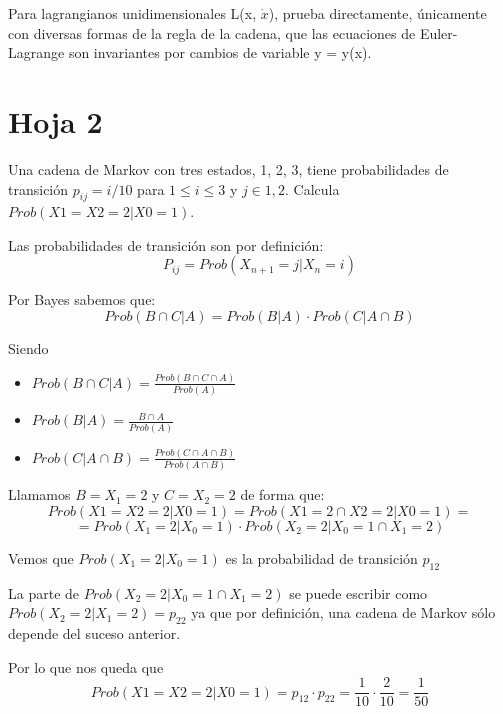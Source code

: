 \begin{problem}[15]
Para lagrangianos unidimensionales L(x, $\dot{x}$), prueba directamente, únicamente con diversas formas de la regla de la cadena, que las ecuaciones de Euler-Lagrange son invariantes por cambios de variable y = y(x).

\solution

\end{problem}

\section{Hoja 2}

\begin{problem}[1]
	Una cadena de Markov con tres estados, {1, 2, 3}, tiene probabilidades de transición
	$p_{ij} = i/10$ para $1 ≤ i ≤ 3$ y $j ∈ {1, 2}$. Calcula $Prob(X1 = X2 = 2|X0 = 1)$.

	\solution
	Las probabilidades de transición son por definición:
	$$P_{ij} = Prob(X_{n+1} = j | X_n = i)$$

	Por Bayes sabemos que:
	$$Prob(B\cap C|A) = Prob(B|A) \cdot Prob(C|A\cap B)$$

	Siendo
	\begin{itemize}
		\item 	$Prob(B\cap C|A) = \frac{Prob(B\cap C \cap A)}{Prob (A)}$
		\item  $ Prob(B|A) = \frac{B\cap A}{Prob(A)}$
		\item  $Prob(C|A\cap B)= \frac{Prob(C\cap A \cap B)}{Prob(A\cap B)}$
	\end{itemize}

	Llamamos $B={X_1 = 2}$ y $C={X_2 = 2}$ de forma que:
	\[Prob(X1 = X2 = 2|X0 = 1) = Prob(X1 = 2 \cap X2 = 2|X0 = 1) =\]
	\[= Prob (X_1=2|X_0=1) \cdot Prob(X_2 =2 |X_0 = 1 \cap X_1 =2)\]

	Vemos que $Prob (X_1=2|X_0=1)$ es la probabilidad de transición $p_{12}$

	La parte de $Prob(X_2 =2 |X_0 = 1 \cap X_1 =2)$ se puede escribir como $Prob(X_2 =2 | X_1 =2) = p_{22}$ ya que por definición, una cadena de Markov sólo depende del suceso anterior.

	Por lo que nos queda que
	$$Prob(X1 = X2 = 2|X0 = 1) = p_{12} \cdot p_{22} = \frac{1}{10} \cdot \frac{2}{10} = \frac{1}{50}$$
\end{problem}




